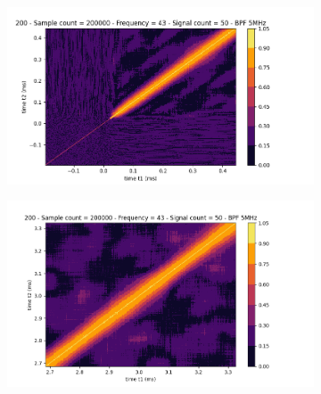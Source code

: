 \documentclass[10pt]{report}
\begin{document}
\begin{figure}[h!]
\centering
\begin{subfigure}{.48\textwidth}
  \centering
  \includegraphics[width=1.1\linewidth]{sp-g12-1}
\end{subfigure}%
\hspace{1em}%
\begin{subfigure}{.48\textwidth}
  \centering
  \includegraphics[width=1.1\linewidth]{sp-g12-3}
\end{subfigure}
\end{figure}
\end{document}
